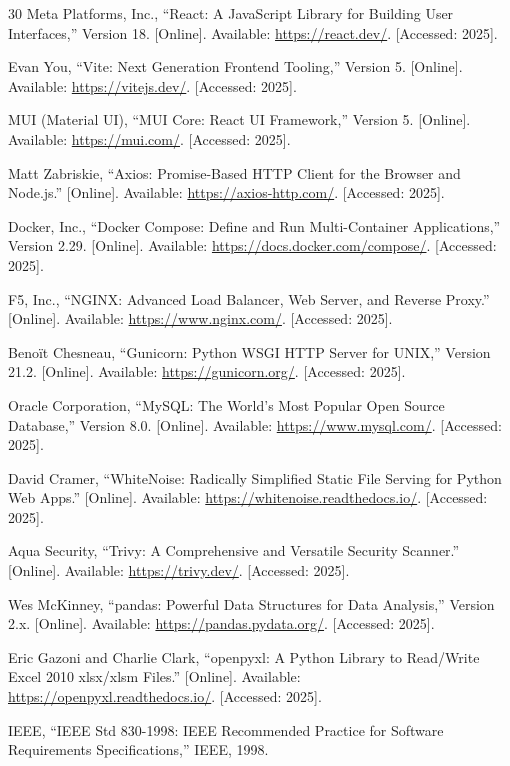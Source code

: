 \begin{thebibliography}{30}
Meta Platforms, Inc., ``React: A JavaScript Library for Building User Interfaces,'' Version 18. [Online]. Available: \url{https://react.dev/}. [Accessed: 2025].

Evan You, ``Vite: Next Generation Frontend Tooling,'' Version 5. [Online]. Available: \url{https://vitejs.dev/}. [Accessed: 2025].

MUI (Material UI), ``MUI Core: React UI Framework,'' Version 5. [Online]. Available: \url{https://mui.com/}. [Accessed: 2025].

Matt Zabriskie, ``Axios: Promise-Based HTTP Client for the Browser and Node.js.'' [Online]. Available: \url{https://axios-http.com/}. [Accessed: 2025].

Docker, Inc., ``Docker Compose: Define and Run Multi-Container Applications,'' Version 2.29. [Online]. Available: \url{https://docs.docker.com/compose/}. [Accessed: 2025].

F5, Inc., ``NGINX: Advanced Load Balancer, Web Server, and Reverse Proxy.'' [Online]. Available: \url{https://www.nginx.com/}. [Accessed: 2025].

Beno\"{i}t Chesneau, ``Gunicorn: Python WSGI HTTP Server for UNIX,'' Version 21.2. [Online]. Available: \url{https://gunicorn.org/}. [Accessed: 2025].

Oracle Corporation, ``MySQL: The World's Most Popular Open Source Database,'' Version 8.0. [Online]. Available: \url{https://www.mysql.com/}. [Accessed: 2025].

David Cramer, ``WhiteNoise: Radically Simplified Static File Serving for Python Web Apps.'' [Online]. Available: \url{https://whitenoise.readthedocs.io/}. [Accessed: 2025].

Aqua Security, ``Trivy: A Comprehensive and Versatile Security Scanner.'' [Online]. Available: \url{https://trivy.dev/}. [Accessed: 2025].

Wes McKinney, ``pandas: Powerful Data Structures for Data Analysis,'' Version 2.x. [Online]. Available: \url{https://pandas.pydata.org/}. [Accessed: 2025].

Eric Gazoni and Charlie Clark, ``openpyxl: A Python Library to Read/Write Excel 2010 xlsx/xlsm Files.'' [Online]. Available: \url{https://openpyxl.readthedocs.io/}. [Accessed: 2025].

IEEE, ``IEEE Std 830-1998: IEEE Recommended Practice for Software Requirements Specifications,'' IEEE, 1998.


\end{thebibliography}
